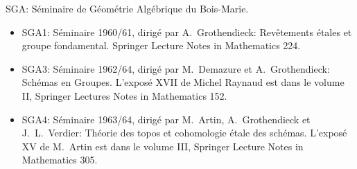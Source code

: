 \documentclass[11pt,a4paper]{article}
\theoremstyle{plain}
\theoremstyle{definition}
\begin{document}
SGA: S\'eminaire de G\'eom\'etrie Alg\'ebrique du Bois-Marie.

\begin{itemize}
\item SGA1: S\'eminaire 1960/61, dirig\'e par A.\ Grothendieck: Rev\^etements \'etales et groupe fondamental. Springer Lecture Notes in Mathematics 224.
\item SGA3: S\'eminaire 1962/64, dirig\'e par M.\ Demazure et A.\ Grothendieck: Sch\'emas en Groupes. L'expos\'e XVII de Michel Raynaud est dans le volume II, Springer Lectures Notes in Mathematics 152.
\item SGA4: S\'eminaire 1963/64, dirig\'e par M.\ Artin, A.\ Grothendieck et J.\ L.\ Verdier: Th\'eorie des topos et cohomologie \'etale des sch\'emas. L'expos\'e XV de M.\ Artin est dans le volume III, Springer Lecture Notes in Mathematics 305.
\end{itemize}
\end{document}
